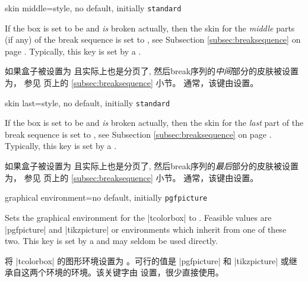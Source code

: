 \begin{docTcbKey}{skin middle}{=}{style, no default, initially \texttt{standard}}

If the box is set to be  and \emph{is} broken actually,
then the skin for the \emph{middle} parts (if any) of the break sequence
is set to , see Subsection \ref{subsec:breaksequence} on page \pageref{subsec:breaksequence}.
Typically, this key is set by a .

如果盒子被设置为 且实际上也是分页了,%
然后break序列的\emph{中间}部分的皮肤被设置为，
参见 \pageref{subsec:breaksequence} 页上的 \ref{subsec:breaksequence} 小节。
通常，该键由设置。

\end{docTcbKey}


\begin{docTcbKey}{skin last}{=}{style, no default, initially \texttt{standard}}

If the box is set to be  and \emph{is} broken actually,
then the skin for the \emph{last} part of the break sequence
is set to , see Subsection \ref{subsec:breaksequence} on page \pageref{subsec:breaksequence}.
Typically, this key is set by a .

如果盒子被设置为 且实际上也是分页了,%
然后break序列的\emph{最后}部分的皮肤被设置为，
参见 \pageref{subsec:breaksequence} 页上的 \ref{subsec:breaksequence} 小节。
通常，该键由设置。

\end{docTcbKey}



\begin{docTcbKey}{graphical environment}{=}{no default, initially \texttt{pgfpicture}}

Sets the graphical environment for the |tcolorbox| to .
Feasible values are |pgfpicture| and |tikzpicture| or environments which inherit from one of these two. 
This key is set by a  and may seldom be used directly.

将 |tcolorbox| 的图形环境设置为 。可行的值是 |pgfpicture| 和 |tikzpicture| 或继承自这两个环境的环境。该关键字由  设置，很少直接使用。

\end{docTcbKey}


